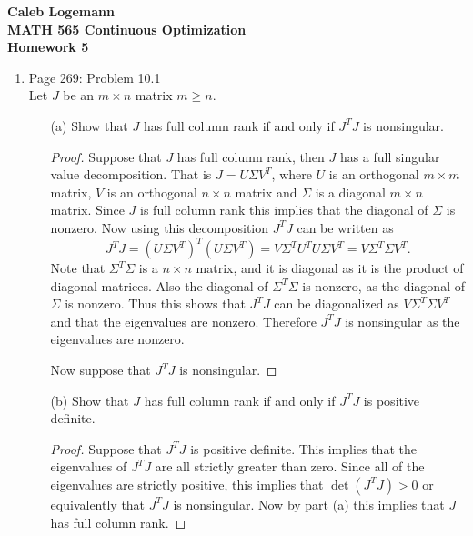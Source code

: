 \documentclass[11pt, oneside]{article}
\begin{document}
\noindent \textbf{\Large{Caleb Logemann \\
MATH 565 Continuous Optimization \\
Homework 5
}}

%
\begin{enumerate}
  \item %
    Page 269: Problem 10.1 \\
    Let $J$ be an $m \times n$ matrix $m \ge n$.
    \begin{enumerate}
      \item[(a)]
        Show that $J$ has full column rank if and only if $J^T J$ is nonsingular.

        \begin{proof}
          Suppose that $J$ has full column rank, then $J$ has a full singular
          value decomposition.
          That is $J = U \Sigma V^T$, where $U$ is an orthogonal $m \times m$
          matrix, $V$ is an orthogonal $n \times n$ matrix and $\Sigma$ is a
          diagonal $m \times n$ matrix.
          Since $J$ is full column rank this implies that the diagonal of
          $\Sigma$ is nonzero.
          Now using this decomposition $J^T J$ can be written as
          \[
            J^T J = (U \Sigma V^T)^T (U \Sigma V^T) = V \Sigma^T U^T U \Sigma V^T = V \Sigma^T \Sigma V^T.
          \]
          Note that $\Sigma^T \Sigma$ is a $n \times n$ matrix, and it is
          diagonal as it is the product of diagonal matrices.
          Also the diagonal of $\Sigma^T \Sigma$ is nonzero, as the diagonal of
          $\Sigma$ is nonzero.
          Thus this shows that $J^T J$ can be diagonalized as
          $V \Sigma^T \Sigma V^T$ and that the eigenvalues are nonzero.
          Therefore $J^T J$ is nonsingular as the eigenvalues are nonzero.

          Now suppose that $J^T J$ is nonsingular. 
        \end{proof}

      \item[(b)] %
        Show that $J$ has full column rank if and only if $J^T J$ is positive definite.

        \begin{proof}
          Suppose that $J^T J$ is positive definite.
          This implies that the eigenvalues of $J^T J$ are all strictly greater
          than zero.
          Since all of the eigenvalues are strictly positive, this implies that
          $\det(J^T J) > 0$ or equivalently that $J^T J$ is nonsingular.
          Now by part (a) this implies that $J$ has full column rank.


\end{proof}
\end{enumerate}
\end{enumerate}
\end{document}
